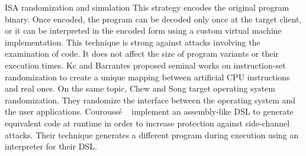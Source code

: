 \begin{strategy}{ISA randomization and simulation}
    \label{strategy:S5}
    \normalfont
    This strategy encodes the original program binary. Once encoded, the program can be decoded only once at the target client, or it can be interpreted in the encoded form using a custom virtual machine implementation. This technique is strong against attacks involving the examination of code. It does not affect the size of program variants or their execution times.
    Kc \etal \cite{Kc03} and Barrantes \etal \cite{barrantes2003randomized} proposed seminal works on instruction-set randomization 
    to create a unique mapping between artificial CPU instructions and real ones.
    On the same topic, Chew and Song \cite{Chew02mitigatingbuffer} target operating system randomization. They randomize the interface between the operating system and the user applications.
    Courouss{\'e} \etal~\cite{courousse2016runtime} implement an assembly-like DSL to generate equivalent code at runtime in order to increase protection against side-channel attacks. Their technique generates a different program during execution using an interpreter for their DSL.

    
\end{strategy}

